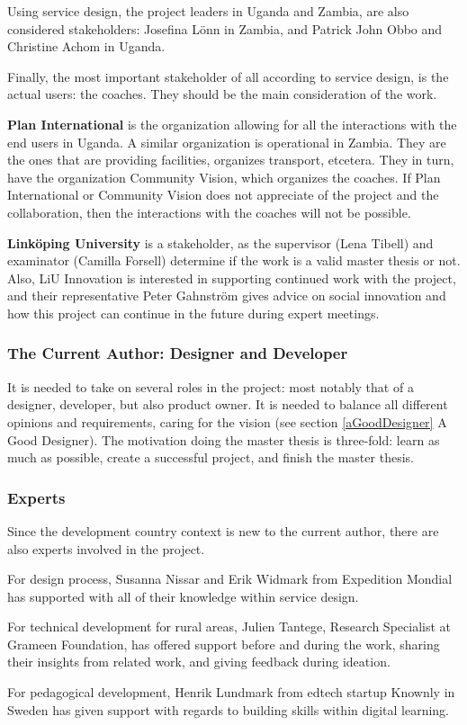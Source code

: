 Using service design, the project leaders in Uganda and Zambia, are also considered stakeholders: Josefina Lönn in Zambia, and Patrick John Obbo and Christine Achom in Uganda.

Finally, the most important stakeholder of all according to service design, is the actual users: the coaches. They should be the main consideration of the work.

\textbf{Plan International} is the organization allowing for all the interactions with the end users in Uganda. A similar organization is operational in Zambia. They are the ones that are providing facilities, organizes transport, etcetera. They in turn, have the organization Community Vision, which organizes the coaches. If Plan International or Community Vision does not appreciate of the project and the collaboration, then the interactions with the coaches will not be possible.

\textbf{Linköping University} is a stakeholder, as the supervisor (Lena Tibell) and examinator (Camilla Forsell) determine if the work is a valid master thesis or not. Also, LiU Innovation is interested in supporting continued work with the project, and their representative Peter Gahnström gives advice on social innovation and how this project can continue in the future during expert meetings.

\subsubsection{The Current Author: Designer and Developer}
It is needed to take on several roles in the project: most notably that of a designer, developer, but also product owner. It is needed to balance all different opinions and requirements, caring for the vision (see section \ref{aGoodDesigner} A Good Designer). The motivation doing the master thesis is three-fold: learn as much as possible, create a successful project, and finish the master thesis.

\subsubsection{Experts}
Since the development country context is new to the current author, there are also experts involved in the project.

For design process, Susanna Nissar and Erik Widmark from Expedition Mondial has supported with all of their knowledge within service design.

For technical development for rural areas, Julien Tantege, Research Specialist at Grameen Foundation, has offered support before and during the work, sharing their insights from related work, and giving feedback during ideation.

For pedagogical development, Henrik Lundmark from edtech startup Knownly in Sweden has given support with regards to building skills within digital learning.

